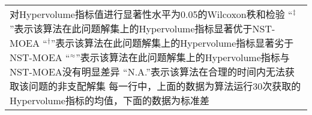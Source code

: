 {\begin{longtable}[c]{lccccccc}
    \bottomrule
    \multicolumn{8}{p{45em}}{
        对Hypervolume指标值进行显著性水平为0.05的Wilcoxon秩和检验\vspace{-.75em}\newline{}
        “$^\ddag$”表示该算法在此问题解集上的Hypervolume指标显著优于NST-MOEA\vspace{-.75em}\newline{}
        “$^\dag$”表示该算法在此问题解集上的Hypervolume指标显著劣于NST-MOEA\vspace{-.75em}\newline{}
        “$^\approx$”表示该算法在此问题解集上的Hypervolume指标与NST-MOEA没有明显差异\vspace{-.75em}\newline{}
        “N.A.”表示该算法在合理的时间内无法获取该问题的非支配解集\vspace{-.75em}\newline{}
        每一行中，上面的数据为算法运行30次获取的Hypervolume指标的均值，下面的数据为标准差
        }
\end{longtable}
}%
